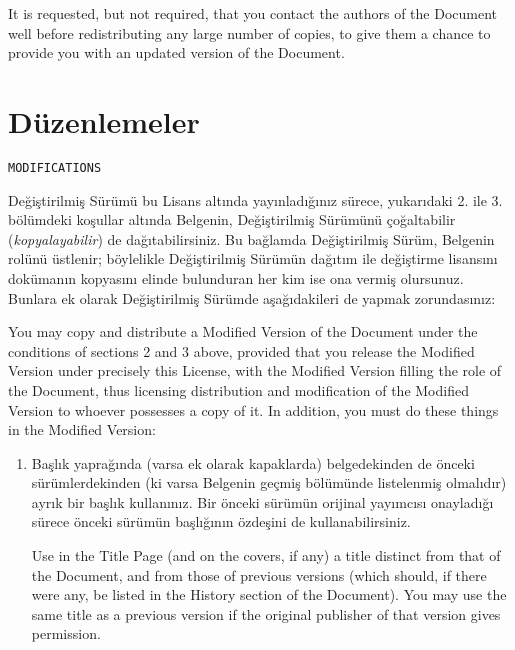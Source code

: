 \begin{multicols}{2}
\begin{ingliz}
It is requested, but not required, that you contact the
authors of the Document well before redistributing any large
number of copies, to give them a chance to provide you with an
updated version of the Document.
\end{ingliz}

\section{Düzenlemeler}\hfill\begin{verbatim}MODIFICATIONS\end{verbatim}
\label{gfdl-4}

Değiştirilmiş Sürümü bu Lisans altında yayınladığınız sürece, yukarıdaki 2. ile 3. bölümdeki koşullar altında Belgenin, Değiştirilmiş Sürümünü çoğaltabilir (\emph{kopyalayabilir}) de dağıtabilirsiniz. Bu bağlamda Değiştirilmiş Sürüm, Belgenin rolünü üstlenir; böylelikle Değiştirilmiş Sürümün dağıtım ile değiştirme lisansını dokümanın kopyasını elinde bulunduran her kim ise ona vermiş olursunuz. Bunlara ek olarak Değiştirilmiş Sürümde aşağıdakileri de yapmak zorundasınız:

\begin{ingliz}
You may copy and distribute a Modified Version of the
Document under the conditions of sections 2 and 3 above,
provided that you release the Modified Version under precisely
this License, with the Modified Version filling the role of
the Document, thus licensing distribution and modification of
the Modified Version to whoever possesses a copy of it.  In
addition, you must do these things in the Modified
Version:
\end{ingliz}

\begin{enumerate}\renewcommand{\theenumi}{\Alph{enumi}}
\item Başlık yaprağında (varsa ek olarak kapaklarda) belgedekinden de önceki sürümlerdekinden (ki varsa Belgenin geçmiş bölümünde listelenmiş olmalıdır) ayrık bir başlık kullanınız. Bir önceki sürümün orijinal yayımcısı onayladığı sürece önceki sürümün başlığının özdeşini de kullanabilirsiniz. 
\begin{ingliz}
Use in the Title Page (and on the covers,
if any) a title distinct from that of the Document, and
from those of previous versions (which should, if there
were any, be listed in the History section of the
Document).  You may use the same title as a previous
version if the original publisher of that version gives
permission.
\end{ingliz}


\end{enumerate}
\end{multicols}
